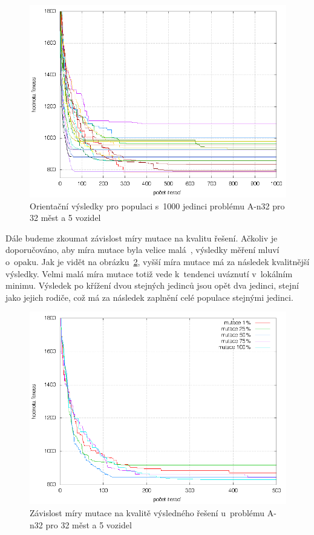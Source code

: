 \documentclass[a4paper]{article}
\begin{document}
\begin{figure}
\centering
\includegraphics[width=\textwidth]{tisic.png}
\caption{Orientační výsledky pro populaci s~1000 jedinci problému A-n32 pro 32 měst a 5 vozidel\label{fig:tisic}}
\end{figure}

Dále budeme zkoumat závislost míry mutace na kvalitu řešení. Ačkoliv je doporučováno, aby míra mutace byla velice malá~\cite{sfc}, výsledky měření mluví o~opaku. Jak je vidět na obrázku~\ref{fig:mutace}, vyšší míra mutace má za následek kvalitnější výsledky. Velmi malá míra mutace totiž vede k~tendenci uváznutí v~lokálním minimu. Výsledek po křížení dvou stejných jedinců jsou opět dva jedinci, stejní jako jejich rodiče, což má za následek zaplnění celé populace stejnými jedinci.

\begin{figure}
\centering
\includegraphics[width=\textwidth]{mutace.png}
\caption{Závislost míry mutace na kvalitě výsledného řešení u~problému A-n32 pro 32 měst a 5 vozidel\label{fig:mutace}}
\end{figure}
\end{document}
